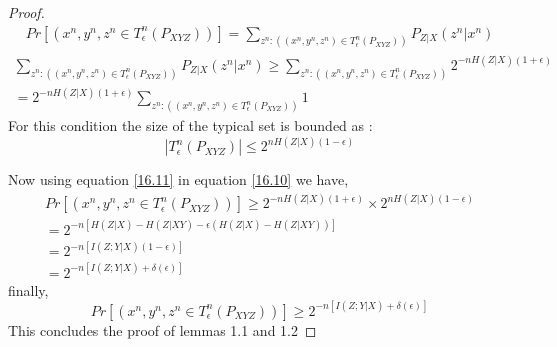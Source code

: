 \documentclass{article}
\begin{document}
\begin{proof}
 \begin{align}
 	Pr \left[ \left( x^n,y^n,z^n \in T^{n}_{\epsilon} \left(  P_{XYZ} \right)\right)\right] = \sum_{z^{n} : \left( (x^n,y^n,z^n )\in T^{n}_{\epsilon} \left(  P_{XYZ} \right) \right) }  P_{Z|X} \left( z^n|x^n \right)  \label{16.8}
 \end{align}
\begin{align}
\sum_{z^{n} : \left( (x^n,y^n,z^n )\in T^{n}_{\epsilon} \left(  P_{XYZ} \right) \right) }  P_{Z|X} \left( z^n|x^n \right)	\geq   \sum_{z^{n} : \left( (x^n,y^n,z^n )\in T^{n}_{\epsilon} \left(  P_{XYZ} \right) \right) } 2^{-nH(Z|X) (1 +\epsilon)}\\
=  2^{-nH(Z|X) (1 +\epsilon)}  \sum_{z^{n} : \left( (x^n,y^n,z^n )\in T^{n}_{\epsilon} \left(  P_{XYZ} \right) \right) } 1 \label{16.10}
\end{align} 
 For this condition the size of the typical set is bounded as :
 \begin{equation}
 	|T^{n}_{\epsilon} \left(  P_{XYZ} \right) | \leq  2^{nH(Z|X) (1 -\epsilon)} \label{16.11}
 \end{equation}
 
 Now using equation \eqref{16.11} in equation \eqref{16.10} we have,
 \begin{align*}
 Pr \left[ \left( x^n,y^n,z^n \in T^{n}_{\epsilon} \left(  P_{XYZ} \right)\right)\right] \geq 2^{-nH(Z|X) (1 +\epsilon)} \times   2^{nH(Z|X) (1 -\epsilon)}\\
 =  2^{ -n \left[ H(Z|X) - H(Z|XY) - \epsilon \left( H(Z|X) - H(Z|XY) \right)\right]} \\ = 2^{ -n \left[I\left( Z ; Y|X\right)(1-\epsilon)\right]}\\
 = 2^{ -n \left[I\left( Z ; Y|X\right) + \delta(\epsilon)\right]}
 \end{align*}
 finally,
 \begin{equation}
  Pr \left[ \left( x^n,y^n,z^n \in T^{n}_{\epsilon} \left(  P_{XYZ} \right)\right)\right] \geq 2^{ -n \left[I\left( Z ; Y|X\right) + \delta(\epsilon)\right]}
 \end{equation} 
This concludes the proof of lemmas 1.1 and 1.2
\end{proof}
\end{document}
